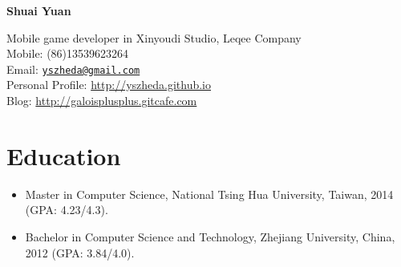 \documentclass[letterpaper]{article}
\def\name{Shuai Yuan}
\begin{document}
\centerline{\huge\bf \name} \vspace{0.25in}
\begin{minipage}[t]{0.8\textwidth}
Mobile game developer in Xinyoudi Studio, Leqee Company \\
Mobile: (86)13539623264   \\
Email: \href{mailto:yszheda@gmail.com}{\tt yszheda@gmail.com}\\
Personal Profile: \url{http://yszheda.github.io} \\
Blog: \url{http://galoisplusplus.gitcafe.com}
\end{minipage}

\section*{Education}
\begin{itemize}
\item Master in Computer Science, National Tsing Hua University, Taiwan, 2014 (GPA: 4.23/4.3).
\item Bachelor in Computer Science and Technology, Zhejiang University, China, 2012 (GPA: 3.84/4.0).
\end{itemize}
\end{document}
